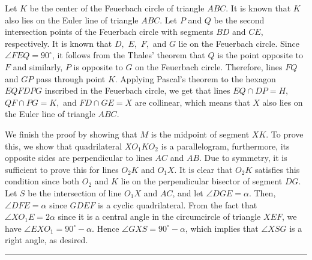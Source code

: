 \documentclass{article}
\begin{document}
	Let \(\displaystyle K\) be the center of the Feuerbach circle of triangle \(\displaystyle ABC\). It is known that \(\displaystyle K\) also lies on the Euler line of triangle \(\displaystyle ABC\). Let \(\displaystyle P\) and \(\displaystyle Q\) be the second intersection points of the Feuerbach circle with segments \(\displaystyle BD\) and \(\displaystyle CE\), respectively. It is known that \(\displaystyle D,\) \(\displaystyle E,\) \(\displaystyle F,\) and \(\displaystyle G\) lie on the Feuerbach circle. Since \(\displaystyle \angle FEQ = 90^{\circ}\), it follows from the Thales' theorem that \(\displaystyle Q\) is the point opposite to \(\displaystyle F\) and similarly, \(\displaystyle P\) is opposite to \(\displaystyle G\) on the Feuerbach circle. Therefore, lines \(\displaystyle FQ\) and \(\displaystyle GP\) pass through point \(\displaystyle K\). Applying Pascal's theorem to the hexagon \(\displaystyle EQFDPG\) inscribed in the Feuerbach circle, we get that lines \(\displaystyle EQ\cap DP = H,\) \(\displaystyle QF\cap PG = K,\) and \(\displaystyle FD\cap GE = X\) are collinear, which means that \(\displaystyle X\) also lies on the Euler line of triangle \(\displaystyle ABC\).
	
	We finish the proof by showing that \(\displaystyle M\) is the midpoint of segment \(\displaystyle XK\). To prove this, we show that quadrilateral \(\displaystyle XO_1KO_2\) is a parallelogram, furthermore, its opposite sides are perpendicular to lines \(\displaystyle AC\) and \(\displaystyle AB\). Due to symmetry, it is sufficient to prove this for lines \(\displaystyle O_2K\) and \(\displaystyle O_1X\). It is clear that \(\displaystyle O_2K\) satisfies this condition since both \(\displaystyle O_2\) and \(\displaystyle K\) lie on the perpendicular bisector of segment \(\displaystyle DG\). Let \(\displaystyle S\) be the intersection of line \(\displaystyle O_1X\) and \(\displaystyle AC\), and let \(\displaystyle \angle DGE = \alpha\). Then, \(\displaystyle \angle DFE = \alpha\) since \(\displaystyle GDEF\) is a cyclic quadrilateral. From the fact that \(\displaystyle \angle XO_1E = 2\alpha\) since it is a central angle in the circumcircle of triangle \(\displaystyle XEF\), we have \(\displaystyle \angle EXO_1 = 90^{\circ}-\alpha\). Hence \(\displaystyle \angle GXS=90^{\circ}-\alpha\), which implies that \(\displaystyle \angle XSG\) is a right angle, as desired.
	
	\vspace{2em}
	\hrule
	\vspace{2em}
	
\end{document}
